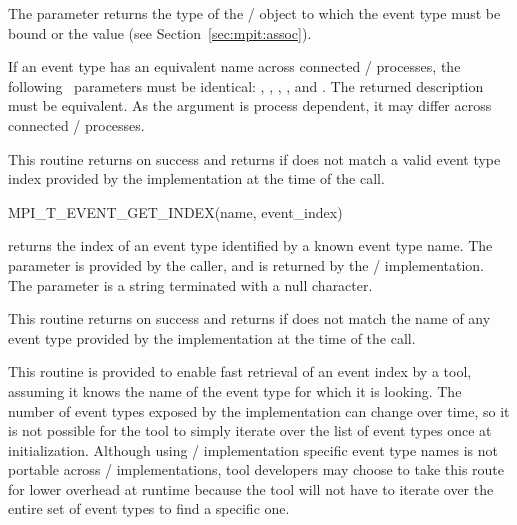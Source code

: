 The parameter  returns the type of the \MPI/ object to which
the event type must be bound or the value 
(see Section~\ref{sec:mpit:assoc}).

If an event type has an equivalent name across connected \MPI/ processes, the
following \OUT\ parameters must be identical: ,
, , ,
and .  The returned description must be equivalent.
As the argument  is process dependent, it
may differ across connected \MPI/ processes.

This routine returns  on success and returns
 if  does not match
a valid event type index provided by the implementation at the time of the
call.

\begin{funcdef}{MPI\_T\_EVENT\_GET\_INDEX}{(\mbox{name}, \mbox{event\_index})}
\end{funcdef}

 returns the index of an event type
identified by a known event type name.  The  parameter is
provided by the caller, and  is returned by the \MPI/
implementation. The  parameter is a string terminated with a
null character.

This routine returns  on success and returns
 if  does not match the name
of any event type provided by the implementation at the time of the call.

\begin{rationale}
This routine is provided to enable fast retrieval of an event index by a 
tool, assuming it knows the name of the event type for which it is looking.
The number of event types exposed by the implementation can change over
time, so it is not possible for the tool to simply iterate over the list of
event types once at initialization.  Although using \MPI/ implementation
specific event type names is not portable across \MPI/ implementations, tool
developers may choose to take this route for lower overhead at runtime
because the tool will not have to iterate over the entire set of event types 
to find a specific one.
\end{rationale}


